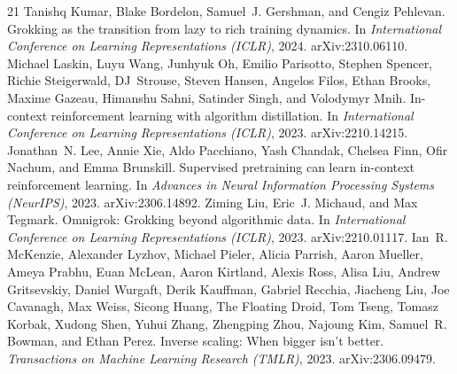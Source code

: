 \documentclass[11pt]{article}
\theoremstyle{plain}
\theoremstyle{definition}
\begin{document}
\begin{thebibliography}{21}
Tanishq Kumar, Blake Bordelon, Samuel~J. Gershman, and Cengiz Pehlevan.
\newblock Grokking as the transition from lazy to rich training dynamics.
\newblock In \emph{International Conference on Learning Representations
  (ICLR)}, 2024. arXiv:2310.06110.
\newblock {}
Michael Laskin, Luyu Wang, Junhyuk Oh, Emilio Parisotto, Stephen Spencer, Richie
  Steigerwald, DJ~Strouse, Steven Hansen, Angelos Filos, Ethan Brooks, Maxime
  Gazeau, Himanshu Sahni, Satinder Singh, and Volodymyr Mnih.
\newblock In-context reinforcement learning with algorithm distillation.
\newblock In \emph{International Conference on Learning Representations (ICLR)}, 2023.
  arXiv:2210.14215.
\newblock {}
Jonathan~N. Lee, Annie Xie, Aldo Pacchiano, Yash Chandak, Chelsea Finn, Ofir
  Nachum, and Emma Brunskill.
\newblock Supervised pretraining can learn in-context reinforcement learning.
\newblock In \emph{Advances in Neural Information Processing Systems
  (NeurIPS)}, 2023.
\newblock arXiv:2306.14892.
\newblock {}
Ziming Liu, Eric~J. Michaud, and Max Tegmark.
\newblock Omnigrok: Grokking beyond algorithmic data.
\newblock In \emph{International Conference on Learning Representations
  (ICLR)}, 2023.
\newblock arXiv:2210.01117.
\newblock {}
Ian~R. McKenzie, Alexander Lyzhov, Michael Pieler, Alicia Parrish, Aaron
  Mueller, Ameya Prabhu, Euan McLean, Aaron Kirtland, Alexis Ross, Alisa Liu,
  Andrew Gritsevskiy, Daniel Wurgaft, Derik Kauffman, Gabriel Recchia, Jiacheng
  Liu, Joe Cavanagh, Max Weiss, Sicong Huang, {The Floating Droid}, Tom Tseng, Tomasz Korbak, Xudong
  Shen, Yuhui Zhang, Zhengping Zhou, Najoung Kim, Samuel~R. Bowman, and Ethan
  Perez.
\newblock Inverse scaling: When bigger isn't better.
\newblock \emph{Transactions on Machine Learning Research (TMLR)}, 2023.
\newblock arXiv:2306.09479.

\end{thebibliography}
\end{document}
